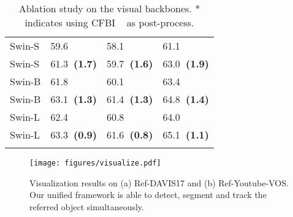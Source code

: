 \documentclass[10pt,twocolumn,letterpaper]{article}
\newcommand{\posacc}[1]{{\bf \fontsize{8.0}{42}\selectfont \color{mygreen}~(#1)}}
\begin{document}
{\begin{table}[t]
\begin{center}
\begin{tabular}{l | l l l }
Swin-S & 59.6 & 58.1 & 61.1 \\
Swin-S & 61.3\posacc{1.7} & 59.7\posacc{1.6} & 63.0\posacc{1.9} \\

\arrayrulecolor{white}\hline
\arrayrulecolor{black}\hline
\arrayrulecolor{white}\hline

Swin-B & 61.8 & 60.1 & 63.4 \\
Swin-B & 63.1\posacc{1.3} & 61.4\posacc{1.3} & 64.8\posacc{1.4} \\

\arrayrulecolor{white}\hline
\arrayrulecolor{black}\hline
\arrayrulecolor{white}\hline

Swin-L & 62.4 & 60.8 & 64.0 \\
Swin-L & 63.3\posacc{0.9} & 61.6\posacc{0.8} & 65.1\posacc{1.1} \\
 
\arrayrulecolor{white}\hline
\arrayrulecolor{black}\hline
\arrayrulecolor{white}\hline


\end{tabular}     \end{center}
    \vspace{-4mm}
    \caption{Ablation study on the visual backbones. * indicates using CFBI ~\cite{yang2020cfbi} as post-process.}
    \label{tab:ab_backbone}
    \vspace{-3mm}
\end{table}









\begin{figure*}[t]
\begin{center}
\texttt{[image: figures/visualize.pdf]}
\end{center}
\vspace{-5mm}
\caption{Visualization results on (a) Ref-DAVIS17 and (b) Ref-Youtube-VOS. Our unified framework is able to detect, segment and track the referred object simultaneously.}
\label{fig:visualize}
\end{figure*}



}
\end{document}
